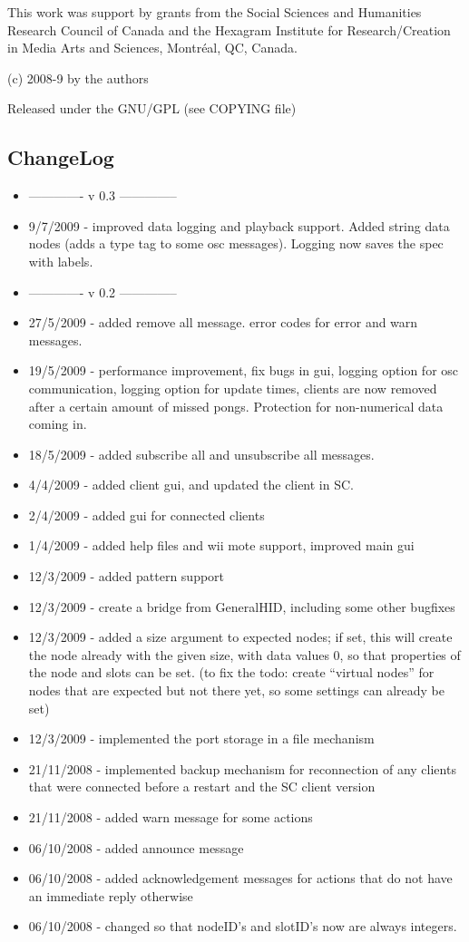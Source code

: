 \documentclass[letterpaper,10pt]{article}
\begin{document}
This work was support by grants from the Social Sciences and Humanities Research Council of Canada and the Hexagram Institute for Research/Creation in Media Arts and Sciences, Montr\'eal, QC, Canada.

(c) 2008-9 by the authors

Released under the GNU/GPL (see COPYING file)

\subsection*{ChangeLog}

\begin{itemize}
 \item ------------- v 0.3 --------------
 \item 9/7/2009 - improved data logging and playback support. Added string data nodes (adds a type tag to some osc messages). Logging now saves the spec with labels.
 \item ------------- v 0.2 --------------
 \item 27/5/2009 - added remove all message. error codes for error and warn messages.
 \item 19/5/2009 - performance improvement, fix bugs in gui, logging option for osc communication, logging option for update times, clients are now removed after a certain amount of missed pongs. Protection for non-numerical data coming in.
 \item 18/5/2009 - added subscribe all and unsubscribe all messages.
 \item 4/4/2009 - added client gui, and updated the client in SC.
 \item 2/4/2009 - added gui for connected clients
 \item 1/4/2009 - added help files and wii mote support, improved main gui
 \item 12/3/2009 - added pattern support
 \item 12/3/2009 - create a bridge from GeneralHID, including some other bugfixes
 \item 12/3/2009 - added a size argument to expected nodes; if set, this will create the node already with the given size, with data values 0, so that properties of the node and slots can be set. (to fix the todo: create ``virtual nodes'' for nodes that are expected but not there yet, so some settings can already be set)
 \item 12/3/2009 - implemented the port storage in a file mechanism
 \item 21/11/2008 - implemented backup mechanism for reconnection of any clients that were connected before a restart and the SC client version
 \item 21/11/2008 - added warn message for some actions
 \item 06/10/2008 - added announce message
 \item 06/10/2008 - added acknowledgement messages for actions that do not have an immediate reply otherwise
 \item 06/10/2008 - changed so that nodeID's and slotID's now are always integers.
\end{itemize}
\end{document}
